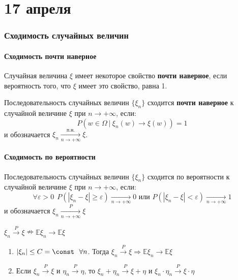 \chapter{17 апреля}

\subsection{Сходимость случайных величин}

\subsubsection{Сходимость почти наверное}

\begin{definition}
    Случайная величина \(\xi\) имеет некоторое свойство \textbf{почти наверное}, если вероятность того, что \(\xi\) имеет это свойство, равна 1.
\end{definition}

\begin{definition}
    Последовательность случайных величин \(\{\xi_n\}\) сходится \textbf{почти наверное} к случайной величине \(\xi\) при \(n \to +\infty\), если:
    \[P(w \in \Omega\ |\ \xi_n(w) \to \xi(w)) = 1\]
    и обозначается \(\xi_n \xrightarrow[n \to +\infty]{\text{п.н.}} \xi\).
\end{definition}

\subsubsection{Сходимость по вероятности}

\begin{definition}
    Последовательность случайных величин \(\{\xi_n\}\) сходится по вероятности к случайной величине \(\xi\) при \(n \to +\infty\), если:
    \[\forall \varepsilon > 0 \ \ P(|\xi_n - \xi| \geq \varepsilon) \xrightarrow[n \to +\infty]{} 0 \text{ или } P(|\xi_n - \xi| < \varepsilon) \xrightarrow[n \to +\infty]{} 1\]
    и обозначается \(\xi_n \xrightarrow[n \to +\infty]{P} \xi\)
\end{definition}

\begin{remark}
    \(\xi_n \xrightarrow{P} \xi \nRightarrow \mathbb{E}\xi_n \to \mathbb{E}\xi\)
\end{remark}

\begin{prop}\itemfix
    \begin{enumerate}
        \item \(|\xi_n| \leq C = \const \ \ \forall n\). Тогда \(\xi_n \xrightarrow{P} \xi \Rightarrow \mathbb{E}\xi_n \to \mathbb{E}\xi\)
        \item Если \(\xi_n \xrightarrow{P} \xi\) и \(\eta_n \xrightarrow{P} \eta\), то \(\xi_n + \eta_n \xrightarrow{P} \xi + \eta\) и \(\xi_n \cdot \eta_n \xrightarrow{P} \xi \cdot \eta\)
    \end{enumerate}
\end{prop}

